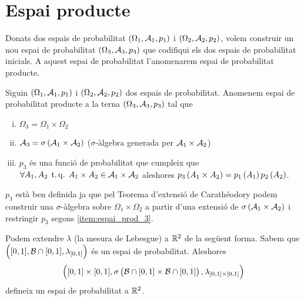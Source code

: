 \section{Espai producte}

Donats dos espais de probabilitat $\left(\Omega_1,\mathcal{A}_1,p_1\right)$ i $\left(\Omega_2,\mathcal{A}_2,p_2\right)$, volem construir un nou espai de probabilitat $\left(\Omega_3,\mathcal{A}_3,p_3\right)$
que codifiqui els dos espais de probabilitat inicials. A aquest espai de probabilitat l'anomenarem espai de probabilitat producte.

\begin{defi}
  Siguin $\left(\Omega_1,\mathcal{A}_1,p_1\right)$ i $\left(\Omega_2,\mathcal{A}_2,p_2\right)$ dos espais de probabilitat. Anomenem espai de probabilitat producte a la terna $\left(\Omega_3,\mathcal{A}_3,p_3\right)$
  tal que
  \begin{enumerate}[i)]
   \item $\Omega_3=\Omega_1\times\Omega_2$
   \item $\mathcal{A}_3 = \sigma\left(\mathcal{A}_1\times\mathcal{A}_2\right)$ ($\sigma$-àlgebra generada per $\mathcal{A}_1\times\mathcal{A}_2$)
   \item \label{item:espai_prod_3}$p_3$ és una funció de probabilitat que cumpleix que $\forall A_1, A_2 \operatorname{\;t.q.\;} A_1\times A_2\in\mathcal{A}_1\times\mathcal{A}_2$ aleshores 
   $p_3\left( A_1\times A_2\right) = p_1\left( A_1\right) p_2\left( A_2\right)$.
  \end{enumerate}
\end{defi}

\begin{obs}
  $p_3$ està ben definida ja que pel Teorema d'extensió de Carathéodory podem construir una $\sigma$-àlgebra sobre $\Omega_1\times\Omega_2$ a partir d'una 
  extensió de $\sigma\left(\mathcal{A}_1\times\mathcal{A}_2\right)$ i restringir $p_3$ segons \ref{item:espai_prod_3}.
\end{obs}

\begin{obs}
  Podem extendre $\lambda$ (la mesura de Lebesgue) a $\mathbb{R}^2$ de la següent forma. Sabem que $\left([0,1], \mathcal{B}\cap[0,1],\lambda_{[0,1]}\right)$ és un espai de probabilitat.
  Aleshores \[\left( [0,1]\times[0,1], \sigma\left(\mathcal{B}\cap[0,1]\times\mathcal{B}\cap[0,1]\right), \lambda_{[0,1]\times[0,1]}\right)\] defineix un espai de probabilitat a $\mathbb{R}^2$.
\end{obs}

